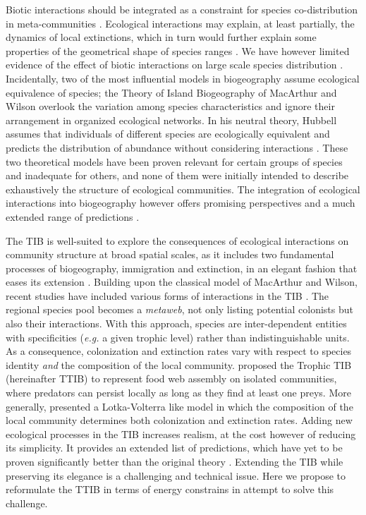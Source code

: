 Biotic interactions should be integrated as a constraint for species
co-distribution in meta-communities \citep{Jabot2012, Cazelles2016a}.
Ecological interactions may explain, at least partially, the dynamics of
local extinctions, which in turn would further explain some properties
of the geometrical shape of species ranges \citep[\emph{e.g.} nested
distributions of parasitoid and its host,][]{Shenbrot2007}. We have
however limited evidence of the effect of biotic interactions on large
scale species distribution \citep[see Chapter \ref{chap3} - but
see][]{Gotelli2010}. Incidentally, two of the most influential models in
biogeography assume ecological equivalence of species; the Theory of
Island Biogeography of MacArthur and Wilson \citep[hereafter
TIB,][]{MacArthur1967} overlook the variation among species
characteristics and ignore their arrangement in organized ecological
networks. In his neutral theory, Hubbell assumes that individuals of
different species are ecologically equivalent and predicts the
distribution of abundance without considering interactions
\citep{Hubbell1997, Hubbell2001}. These two theoretical models have been
proven relevant for certain groups of species and inadequate for others,
and none of them were initially intended to describe exhaustively the
structure of ecological communities. The integration of ecological
interactions into biogeography however offers promising perspectives and
a much extended range of predictions \citep{Holt2010, Gravel2011}.

The TIB is well-suited to explore the consequences of ecological
interactions on community structure at broad spatial scales, as it
includes two fundamental processes of biogeography, immigration and
extinction, in an elegant fashion that eases its extension
\citep{Losos2010, Warren2015}. Building upon the classical model of
MacArthur and Wilson, recent studies have included various forms of
interactions in the TIB \citep{Gravel2011, Cazelles2016a}. The regional
species pool becomes a \emph{metaweb}, not only listing potential
colonists but also their interactions. With this approach, species are
inter-dependent entities with specificities (\emph{e.g.} a given trophic
level) rather than indistinguishable units. As a consequence,
colonization and extinction rates vary with respect to species identity
\emph{and} the composition of the local community. \citet{Gravel2011}
proposed the Trophic TIB (hereinafter TTIB) to represent food web
assembly on isolated communities, where predators can persist locally as
long as they find at least one preys. More generally,
\citet{Cazelles2016a} presented a Lotka-Volterra like model in which the
composition of the local community determines both colonization and
extinction rates. Adding new ecological processes in the TIB increases
realism, at the cost however of reducing its simplicity. It provides an
extended list of predictions, which have yet to be proven significantly
better than the original theory \citep[see][]{Cirtwill2015}. Extending
the TIB while preserving its elegance is a challenging and technical
issue. Here we propose to reformulate the TTIB in terms of energy
constrains in attempt to solve this challenge.

